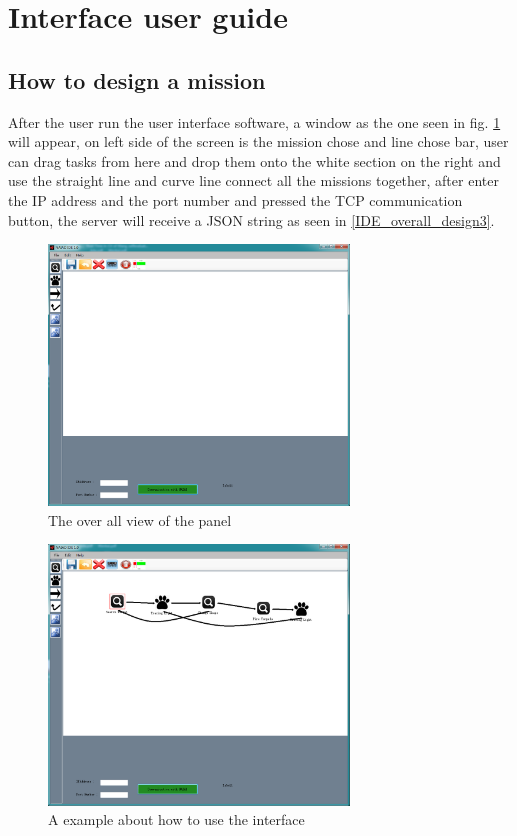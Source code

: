 \section{Interface user guide}
\label{interface}
\noindent
\subsection{How to design a mission}
After the user run the user interface software, a window as the one seen in fig. \ref{IDE_overall_design} will appear, on left side of the screen is the mission chose and line chose bar, user can drag tasks from here and drop them onto the white section on the right and use the straight line and curve line connect all the missions together, after enter the IP address and the port number and pressed  the TCP communication button, the server will receive a JSON string as seen in \ref{IDE_overall_design3}.
\begin{figure}[!ht]
	\begin{center}
		\includegraphics[width=80mm]{./Images/Software/over_all_view_of_the_panel.png}
		\caption{The over all view of the panel}
		\label{IDE_overall_design}
	\end{center}
\end{figure}
\begin{figure}[!ht]
	\begin{center}
		\includegraphics[width=80mm]{./Images/Software/Example_of_how_to_use.png}
		\caption{A example about how to use the interface}
		\label{IDE_overall_design2}
	\end{center}
\end{figure}
